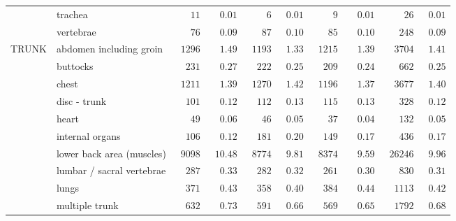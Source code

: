 \documentclass[9pt, oneside]{article}   	%
\begin{document}
\begin{longtable}{p{1.8in}p{2.2in}cccccccc}
 & trachea  & $\phantom{000}11$ & $\phantom{00}0.01$ & $\phantom{0000}6$ & $\phantom{0}0.01$ & $\phantom{0000}9$ & $\phantom{00}0.01$ & $\phantom{0000}26$ & $\phantom{0}0.01$ \\
 & vertebrae  & $\phantom{000}76$ & $\phantom{00}0.09$ & $\phantom{000}87$ & $\phantom{0}0.10$ & $\phantom{000}85$ & $\phantom{00}0.10$ & $\phantom{000}248$ & $\phantom{0}0.09$ \\
TRUNK & abdomen including groin  & $\phantom{0}1296$ & $\phantom{00}1.49$ & $\phantom{0}1193$ & $\phantom{0}1.33$ & $\phantom{0}1215$ & $\phantom{00}1.39$ & $\phantom{00}3704$ & $\phantom{0}1.41$ \\
 & buttocks  & $\phantom{00}231$ & $\phantom{00}0.27$ & $\phantom{00}222$ & $\phantom{0}0.25$ & $\phantom{00}209$ & $\phantom{00}0.24$ & $\phantom{000}662$ & $\phantom{0}0.25$ \\
 & chest  & $\phantom{0}1211$ & $\phantom{00}1.39$ & $\phantom{0}1270$ & $\phantom{0}1.42$ & $\phantom{0}1196$ & $\phantom{00}1.37$ & $\phantom{00}3677$ & $\phantom{0}1.40$ \\
 & disc - trunk  & $\phantom{00}101$ & $\phantom{00}0.12$ & $\phantom{00}112$ & $\phantom{0}0.13$ & $\phantom{00}115$ & $\phantom{00}0.13$ & $\phantom{000}328$ & $\phantom{0}0.12$ \\
 & heart  & $\phantom{000}49$ & $\phantom{00}0.06$ & $\phantom{000}46$ & $\phantom{0}0.05$ & $\phantom{000}37$ & $\phantom{00}0.04$ & $\phantom{000}132$ & $\phantom{0}0.05$ \\
 & internal organs  & $\phantom{00}106$ & $\phantom{00}0.12$ & $\phantom{00}181$ & $\phantom{0}0.20$ & $\phantom{00}149$ & $\phantom{00}0.17$ & $\phantom{000}436$ & $\phantom{0}0.17$ \\
 & lower back area (muscles)  & $\phantom{0}9098$ & $\phantom{0}10.48$ & $\phantom{0}8774$ & $\phantom{0}9.81$ & $\phantom{0}8374$ & $\phantom{00}9.59$ & $\phantom{0}26246$ & $\phantom{0}9.96$ \\
 & lumbar / sacral vertebrae  & $\phantom{00}287$ & $\phantom{00}0.33$ & $\phantom{00}282$ & $\phantom{0}0.32$ & $\phantom{00}261$ & $\phantom{00}0.30$ & $\phantom{000}830$ & $\phantom{0}0.31$ \\
 & lungs  & $\phantom{00}371$ & $\phantom{00}0.43$ & $\phantom{00}358$ & $\phantom{0}0.40$ & $\phantom{00}384$ & $\phantom{00}0.44$ & $\phantom{00}1113$ & $\phantom{0}0.42$ \\
 & multiple trunk  & $\phantom{00}632$ & $\phantom{00}0.73$ & $\phantom{00}591$ & $\phantom{0}0.66$ & $\phantom{00}569$ & $\phantom{00}0.65$ & $\phantom{00}1792$ & $\phantom{0}0.68$ \\

\end{longtable}
\end{document}
